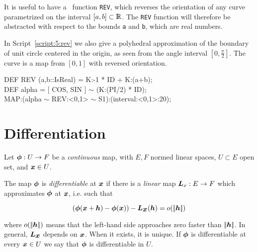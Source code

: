 \documentclass{31x47jw}
\begin{document}
\begin{example}
\label{ex:rev}
    
It is useful to have a \pl\ function \texttt{REV}, which reverses
the orientation of any curve parametrized on the interval
$[a,b]\subset\mathbb{I\!\!R}$.  The \texttt{REV} function will therefore be 
abstracted with respect to the bounds \texttt{a} and
\texttt{b}, which are real numbers.

In Script~\ref{script:5:rev} we also give a polyhedral approximation
of the boundary of unit circle centered in the
origin, as seen from the angle interval $[0,\frac{\pi}{2}]$.  The curve
is a map from $[0,1]$ with reversed orientation.  

\begin{script} 
\begin{smallplasm}
DEF REV  (a,b::IsReal) = K:-1 * ID + K:(a+b);\\%

DEF alpha = [ COS, SIN ] $\sim$ (K:(PI/2) * ID);\\[0.3cm]

MAP:(alpha $\sim$ REV:<0,1> $\sim$ S1):(interval:<0,1>:20);
\end{smallplasm}
\label{script:5:rev}
\end{script}

\end{example}

\section{Differentiation}
\label{sec:5:differentiation}


Let ${\mbox{\boldmath $\phi$}}: U \rightarrow F$ be a \emph{continuous} map, with $E,
F$ normed linear spaces, $U\subset E$ open set, and ${\mbox{\boldmath $x$}}\in U$.
    
\begin{definition}
    The map ${\mbox{\boldmath $\phi$}}$ is \emph{differentiable} at ${\mbox{\boldmath $x$}}$ if there is a
    \emph{linear} map ${\mbox{\boldmath $L$}}_{x}: E \rightarrow F$ which approximates
    ${\mbox{\boldmath $\phi$}}$ at ${\mbox{\boldmath $x$}}$, i.e. such that
    
    \[
    ({\mbox{\boldmath $\phi$}}({\mbox{\boldmath $x$}}+{\mbox{\boldmath $h$}}) - {\mbox{\boldmath $\phi$}}({\mbox{\boldmath $x$}})) - {\mbox{\boldmath $L$}}_{{\mbox{\boldmath $x$}}}({\mbox{\boldmath $h$}}) =
    o({\left|\!\left|{\mbox{\boldmath $h$}}\right|\!\right|})
    \]
\end{definition}
where $o({\left|\!\left|{\mbox{\boldmath $h$}}\right|\!\right|})$ means that the left-hand side approaches zero
faster than ${\left|\!\left|{\mbox{\boldmath $h$}}\right|\!\right|}$.  In general, ${\mbox{\boldmath $L$}}_{{\mbox{\boldmath $x$}}}$ depends on
${\mbox{\boldmath $x$}}$.  When it exists, it is unique.  If ${\mbox{\boldmath $\phi$}}$ is differentiable at
every ${\mbox{\boldmath $x$}}\in U$ we say that ${\mbox{\boldmath $\phi$}}$ is differentiable in $U$.
\end{document}
